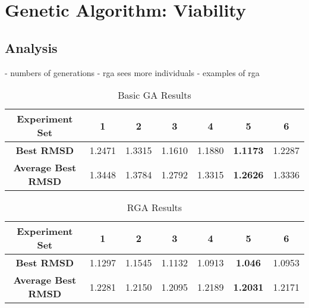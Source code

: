 \section{Genetic Algorithm: Viability}

\subsection{Analysis}

- numbers of generations
- rga sees more individuals
- examples of rga


\begin{table}
	\label{table:basic-ga-results}
	\centering
	\begin{tabular}{ | >{\bfseries}c | c | c | c | c | c | c | }
		\hline
		Experiment Set & 1 & 2 & 3 & 4 & 5 & 6 \\ \hline
		Best RMSD & 1.2471 & 1.3315 & 1.1610 & 1.1880 & \textbf{1.1173} & 1.2287 \\ \hline
		Average Best RMSD & 1.3448 & 1.3784 & 1.2792 & 1.3315 & \textbf{1.2626} & 1.3336 \\ \hline
	\end{tabular}
	\caption{Basic GA Results}
\end{table}

\begin{table}
	\label{table:rga-results}
	\centering
	\begin{tabular}{ | >{\bfseries}c | c | c | c | c | c | c | }
		\hline
		Experiment Set & 1 & 2 & 3 & 4 & 5 & 6 \\ \hline
		Best RMSD & 1.1297 & 1.1545 & 1.1132 & 1.0913 & \textbf{1.046} & 1.0953 \\ \hline
		Average Best RMSD & 1.2281 & 1.2150 & 1.2095 & 1.2189 & \textbf{1.2031} & 1.2171 \\ \hline
	\end{tabular}
	\caption{RGA Results}
\end{table}